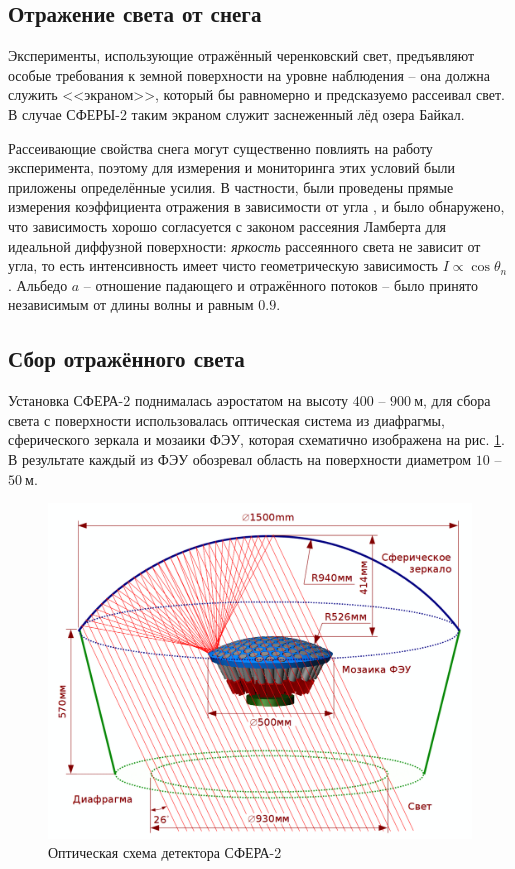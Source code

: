 \documentclass[12pt]{book}
\begin{document}
	\subsection{Отражение света от снега}
	\label{sect:snow-reflection}
	
	Эксперименты, использующие отражённый черенковский свет, предъявляют особые требования к земной поверхности на уровне наблюдения -- она должна служить <<экраном>>, который бы равномерно и предсказуемо рассеивал свет. В случае СФЕРЫ-2 таким экраном служит заснеженный лёд озера Байкал.
	
	Рассеивающие свойства снега могут существенно повлиять на работу эксперимента, поэтому для измерения и мониторинга этих условий были приложены определённые усилия. В частности, были проведены прямые измерения коэффициента отражения в зависимости от угла \cite[рис.~11]{Sphere2015}, и было обнаружено, что зависимость хорошо согласуется с законом рассеяния Ламберта для идеальной диффузной поверхности: \textit{яркость} рассеянного света не зависит от угла, то есть интенсивность имеет чисто геометрическую зависимость $I \propto \cos \theta_n$ \cite{Antonov2019}. Альбедо $a$ -- отношение падающего и отражённого потоков -- было принято независимым от длины волны \cite{Warren1982} и равным $0.9$.
	
	\subsection{Сбор отражённого света}
	
	Установка СФЕРА-2 поднималась аэростатом на высоту $400$ -- $900~\text{м}$, для сбора света с поверхности использовалась оптическая система из диафрагмы, сферического зеркала и мозаики ФЭУ, которая схематично изображена на рис. \ref{pic:sphere-detector-optical-scheme}. В результате каждый из ФЭУ обозревал область на поверхности диаметром $10$ -- $50~\text{м}$.
	
	\begin{figure}
		\centering
		\includegraphics[width=\columnwidth]{optical_scheme}
		\caption{Оптическая схема детектора СФЕРА-2}
		\label{pic:sphere-detector-optical-scheme}
	\end{figure}
\end{document}
